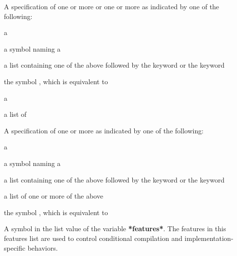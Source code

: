 \documentclass[10pt,twoside,english,pdftex]{article}
\begin{document}
\begin{glossary-list}

%
%
%
A specification of one or more  or one or more
 as indicated by one of the following:
\begin{tightitemize}
\item a 
\item a symbol naming a 
\item
{}%
%
a list containing one of the above followed by the keyword
 or the keyword 
\item the symbol , which is equivalent to
\item a 
\item a list of 
\end{tightitemize}


%
%
%
A specification of one or more  as indicated by
one of the following:
\begin{tightitemize}
\item a 
\item a symbol naming a 
\item
{}%
%
a list containing one of the above followed by the keyword
 or the keyword 
\item a list of one or more of the above
\item the symbol , which is equivalent to
\end{tightitemize}


\glent[feature]
%
%
A symbol in the list value of the variable \textbf{*features*}.  The features
in this features list are used to control conditional compilation and
implementation-specific behaviors.


\end{glossary-list}
\end{document}

